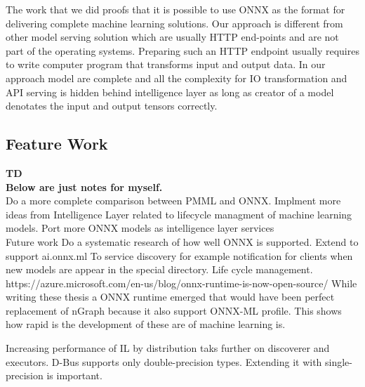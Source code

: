 \documentclass[english, 12pt, a4paper, elec, utf8, online]{aaltothesis}
\begin{document}
The work that we did proofs that it is possible to use ONNX as the format for delivering complete machine learning solutions. Our approach is different from other model serving solution which are usually HTTP end-points and are not part of the operating systems. Preparing such an HTTP endpoint usually requires to write computer program that transforms input and output data. In our approach model are complete and all the complexity for IO transformation and API serving is hidden behind intelligence layer as long as creator of a model denotates the input and output tensors correctly.        
 
\subsection{Feature Work}   
\textbf{TD}\\   
\textbf{Below are just notes for myself.}     \\            
Do a more complete comparison between PMML and ONNX.      
Implment more ideas from Intelligence Layer related to lifecycle managment of machine learning models.
Port more ONNX models as intelligence layer services 
\\
Future work
Do a systematic research of how well ONNX is supported. 
Extend to support ai.onnx.ml 
To service discovery for example notification for clients when new models are appear in the special directory.
Life cycle management.    
https://azure.microsoft.com/en-us/blog/onnx-runtime-is-now-open-source/
While writing these thesis a ONNX runtime emerged that would have been perfect replacement of nGraph because it also support ONNX-ML profile. This shows how rapid is the development of these are of machine learning is.

Increasing performance of IL by distribution taks further on discoverer and executors.
D-Bus supports only double-precision types. Extending it with single-precision is important.      
\end{document}
